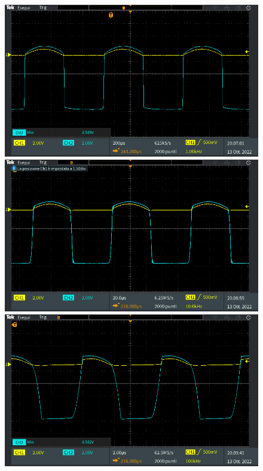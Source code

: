 \begin{figure}[!ht]
	\centering
	\begin{minipage}{.496\textwidth}
		\includegraphics[width=\linewidth]{./ImageFiles/Laboratorio 2/TEK00030.PNG}
	\end{minipage}
	\begin{minipage}{.496\textwidth}
		\includegraphics[width=\linewidth]{./ImageFiles/Laboratorio 2/TEK00032.PNG}
	\end{minipage}
	\begin{minipage}{.496\textwidth}
		\includegraphics[width=\linewidth]{./ImageFiles/Laboratorio 2/TEK00034.PNG}

\end{minipage}
\end{figure}
